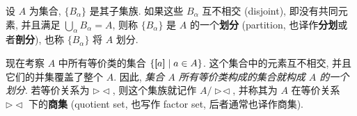 \documentclass[lang=cn,zihao=-4,twoside,fontset=none]{textbook}
\newcommand{\equivclass}[1]{\left[\hspace{-3pt}\left[#1\right]\hspace{-2.5pt}\right]}
\begin{document}
\begin{defi}[划分]\label{def:1.1.4}
    设 $A$ 为集合, $\{B_\alpha\}$ 是其子集族. 如果这些 $B_\alpha$ 互不相交 (disjoint), 即没有共同元素, 并且满足 $\bigcup_\alpha B_\alpha=A$, 则称 $\{B_\alpha\}$ 是 $A$ 的一个\textbf{划分} (partition, 也译作\textbf{分划}或者\textbf{剖分}), 也称 $\{B_\alpha\}$ 将 $A$ 划分. 
\end{defi}



现在考察 $A$ 中所有等价类的集合 $\{\equivclass{a}\mid a\in A\}$. 这个集合中的元素互不相交, 并且它们的并集覆盖了整个 $A$. 因此, \textit{集合 $A$ 所有等价类构成的集合就构成 $A$ 的一个划分}. 若等价关系为 $\triangleright\!\triangleleft$, 则这个集族就记作 $A/\mathop{\triangleright\!\triangleleft}$, 并称其为 $A$ 在等价关系 $\triangleright\!\triangleleft$ 下的\textbf{商集} (quotient set, 也写作 factor set, 后者通常也译作商集). 
\end{document}
